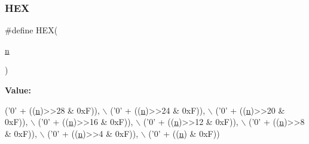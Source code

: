 \subsubsection{\texorpdfstring{H\+EX}{HEX}}
{\footnotesize\ttfamily \#define H\+EX(\begin{DoxyParamCaption}\item[{}]{\hyperlink{write__vtu__template_8cpp_a781a04ab095280f838ff3eb0e51312e0}{n} }\end{DoxyParamCaption})}

{\bfseries Value\+:}
\begin{DoxyCode}
(\textcolor{charliteral}{'0'} + ((\hyperlink{v_plot_field2_d_8m_a4c2d80ab32fc3a598413ae25e9f2bdce}{n})>>28 & 0xF)), \(\backslash\)
  (\textcolor{charliteral}{'0'} + ((\hyperlink{v_plot_field2_d_8m_a4c2d80ab32fc3a598413ae25e9f2bdce}{n})>>24 & 0xF)), \(\backslash\)
  (\textcolor{charliteral}{'0'} + ((\hyperlink{v_plot_field2_d_8m_a4c2d80ab32fc3a598413ae25e9f2bdce}{n})>>20 & 0xF)), \(\backslash\)
  (\textcolor{charliteral}{'0'} + ((\hyperlink{v_plot_field2_d_8m_a4c2d80ab32fc3a598413ae25e9f2bdce}{n})>>16 & 0xF)), \(\backslash\)
  (\textcolor{charliteral}{'0'} + ((\hyperlink{v_plot_field2_d_8m_a4c2d80ab32fc3a598413ae25e9f2bdce}{n})>>12 & 0xF)), \(\backslash\)
  (\textcolor{charliteral}{'0'} + ((\hyperlink{v_plot_field2_d_8m_a4c2d80ab32fc3a598413ae25e9f2bdce}{n})>>8  & 0xF)), \(\backslash\)
  (\textcolor{charliteral}{'0'} + ((\hyperlink{v_plot_field2_d_8m_a4c2d80ab32fc3a598413ae25e9f2bdce}{n})>>4  & 0xF)), \(\backslash\)
  (\textcolor{charliteral}{'0'} + ((\hyperlink{v_plot_field2_d_8m_a4c2d80ab32fc3a598413ae25e9f2bdce}{n})     & 0xF))
\end{DoxyCode}
\mbox{\label{3rd_party_2parmetis-4_80_83_2build_2_darwin-x86__64_2_c_make_files_23_88_82_2_compiler_id_c_2_c_make_c_compiler_id_8c_adbc5372f40838899018fadbc89bd588b}} 
